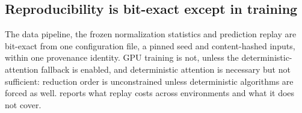 \subsection{Reproducibility is bit-exact except in training}
\label{sec:lim-determinism}

The data pipeline, the frozen normalization statistics and prediction replay are bit-exact from one
configuration file, a pinned seed and content-hashed inputs, within one provenance identity. GPU
training is not, unless the deterministic-attention fallback is enabled, and deterministic
attention is necessary but not sufficient: reduction order is unconstrained unless deterministic
algorithms are forced as well.  reports what replay costs across
environments and what it does not cover.
